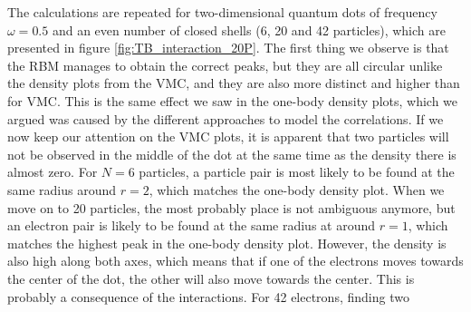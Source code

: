 The calculations are repeated for two-dimensional quantum dots of frequency $\omega=0.5$ and an even number of closed shells (6, 20 and 42 particles), which are presented in figure \eqref{fig:TB_interaction_20P}. The first thing we observe is that the RBM manages to obtain the correct peaks, but they are all circular unlike the density plots from the VMC, and they are also more distinct and higher than for VMC. This is the same effect we saw in the one-body density plots, which we argued was caused by the different approaches to model the correlations. If we now keep our attention on the VMC plots, it is apparent that two particles will not be observed in the middle of the dot at the same time as the density there is almost zero. For $N=6$ particles, a particle pair is most likely to be found at the same radius around $r=2$, which matches the one-body density plot. When we move on to 20 particles, the most probably place is not ambiguous anymore, but an electron pair is likely to be found at the same radius at around $r=1$, which matches the highest peak in the one-body density plot. However, the density is also high along both axes, which means that if one of the electrons moves towards the center of the dot, the other will also move towards the center. This is probably a consequence of the interactions. For 42 electrons, finding two 

